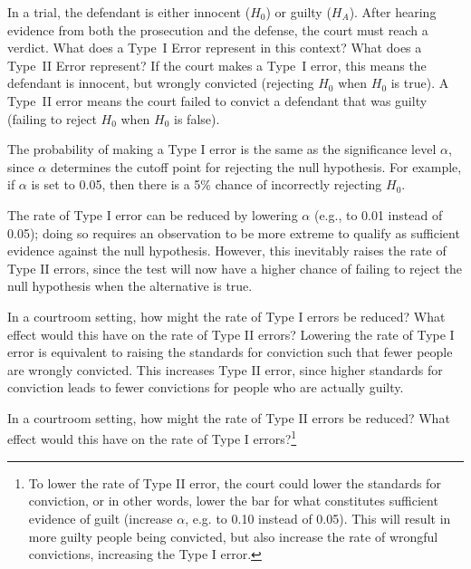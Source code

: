 \begin{spacing}{1.5}
\begin{example}
{In a trial, the defendant is either innocent ($H_0$) or guilty ($H_A$). After hearing evidence from both the prosecution and the defense, the court must reach a verdict. What does a Type~I Error represent in this context? What does a Type~II Error represent?}	
If the court makes a Type~I error, this means the defendant is innocent, but wrongly convicted (rejecting $H_0$ when $H_0$ is true). A Type~II error means the court failed to convict a defendant that was guilty (failing to reject $H_0$ when $H_0$ is false).		
\label{whatAreTheErrorTypesInUSCourts}	
\end{example}

The probability of making a Type I error is the same as the significance level $\alpha$, since $\alpha$ determines the cutoff point for rejecting the null hypothesis. For example, if $\alpha$ is set to 0.05, then there is a 5\% chance of incorrectly rejecting $H_0$. 

The rate of Type I error can be reduced by lowering $\alpha$ (e.g., to 0.01 instead of 0.05); doing so requires an observation to be more extreme to qualify as sufficient evidence against the null hypothesis. However, this inevitably raises the rate of Type II errors, since the test will now have a higher chance of failing to reject the null hypothesis when the alternative is true.

\begin{example}
{In a courtroom setting, how might the rate of Type I errors be reduced? What effect would this have on the rate of Type II errors?}	
Lowering the rate of Type I error is equivalent to raising the standards for conviction such that fewer people are wrongly convicted. This increases Type II error, since higher standards for conviction leads to fewer convictions for people who are actually guilty.
\end{example}


\begin{exercise} \label{howToReduceType2ErrorsInUSCourts}
	In a courtroom setting, how might the rate of Type II errors be reduced? What effect would this have on the rate of Type I errors?\footnote{To lower the rate of Type II error, the court could lower the standards for conviction, or in other words, lower the bar for what constitutes sufficient evidence of guilt (increase $\alpha$, e.g. to 0.10 instead of 0.05). This will result in more guilty people being convicted, but also increase the rate of wrongful convictions, increasing the Type I error.}
\end{exercise}


\end{spacing}

